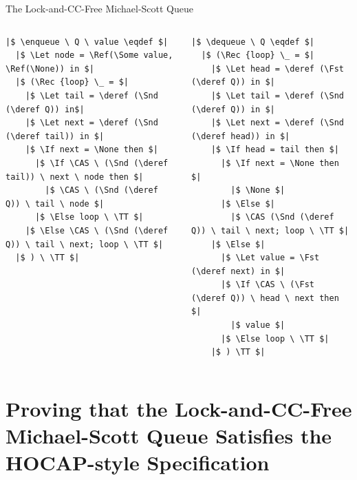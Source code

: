 \documentclass[9pt,xcolor={dvipsnames}]{beamer}
\newcommand{\enqueue}{\operatorname{enqueue}}
\newcommand{\dequeue}{\operatorname{dequeue}}
\begin{document}
\begin{frame}[fragile]{The Lock-and-CC-Free Michael-Scott Queue}
\begin{columns}
\begin{column}{0.5\textwidth}
\begin{verbatim}
|$ \enqueue \ Q \ value \eqdef $|
  |$ \Let node = \Ref(\Some value, \Ref(\None)) in $|
  |$ (\Rec {loop} \_ = $|
    |$ \Let tail = \deref (\Snd (\deref Q)) in$|
    |$ \Let next = \deref (\Snd (\deref tail)) in $|
    |$ \If next = \None then $|
      |$ \If \CAS \ (\Snd (\deref tail)) \ next \ node then $|
        |$ \CAS \ (\Snd (\deref Q)) \ tail \ node $|
      |$ \Else loop \ \TT $|
    |$ \Else \CAS \ (\Snd (\deref Q)) \ tail \ next; loop \ \TT $|
  |$ ) \ \TT $|
      \end{verbatim}
    \end{column}
    \begin{column}{0.5\textwidth}
      \begin{verbatim}
|$ \dequeue \ Q \eqdef $|
  |$ (\Rec {loop} \_ = $|
    |$ \Let head = \deref (\Fst (\deref Q)) in $|
    |$ \Let tail = \deref (\Snd (\deref Q)) in $|
    |$ \Let next = \deref (\Snd (\deref head)) in $|
    |$ \If head = tail then $|
      |$ \If next = \None then $|
        |$ \None $|
      |$ \Else $|
        |$ \CAS (\Snd (\deref Q)) \ tail \ next; loop \ \TT $|
    |$ \Else $|
      |$ \Let value = \Fst (\deref next) in $|
      |$ \If \CAS \ (\Fst (\deref Q)) \ head \ next then $|
        |$ value $|
      |$ \Else loop \ \TT $|
    |$ ) \TT $|
        \end{verbatim}
    \end{column}
  \end{columns}
\end{frame}


\section{Proving that the Lock-and-CC-Free Michael-Scott Queue Satisfies the HOCAP-style Specification}
\end{document}
